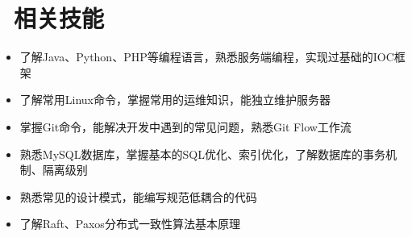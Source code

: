 \documentclass{resume}
\begin{document}
\section{\faInfo\ 相关技能}
  \begin{onehalfspacing}
    \begin{itemize}
      \item 了解Java、Python、PHP等编程语言，熟悉服务端编程，实现过基础的IOC框架
      \item 了解常用Linux命令，掌握常用的运维知识，能独立维护服务器
      \item 掌握Git命令，能解决开发中遇到的常见问题，熟悉Git Flow工作流
      \item 熟悉MySQL数据库，掌握基本的SQL优化、索引优化，了解数据库的事务机制、隔离级别
      \item 熟悉常见的设计模式，能编写规范低耦合的代码
      \item 了解Raft、Paxos分布式一致性算法基本原理
    \end{itemize}
  \end{onehalfspacing}
\end{document}
